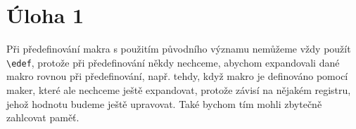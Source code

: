 \documentclass{fkssolpub}
\author{Ondřej Sedláček}
\begin{document}
\section{Úloha 1}

Při předefinování makra s použitím původního významu nemůžeme vždy použít \verb|\edef|, protože při předefinování někdy nechceme, abychom expandovali dané makro rovnou při předefinování, např. tehdy, když makro je definováno pomocí maker, které ale nechceme ještě expandovat, protože závisí na nějakém registru, jehož hodnotu budeme ještě upravovat. Také bychom tím mohli zbytečně zahlcovat paměť.
\end{document}
